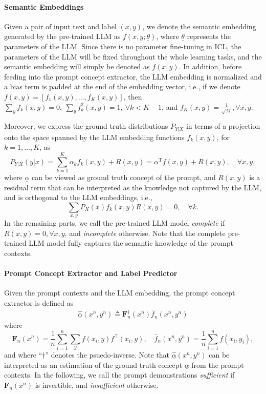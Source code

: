 \documentclass{article} %
\theoremstyle{plain} %
\begin{document}
\paragraph{Semantic Embeddings} 

Given a pair of input text and label $(x,y)$, we denote the semantic embedding generated by the pre-trained LLM as $f(x,y;\underline{\theta})$, where $\underline{\theta}$ represents the parameters of the LLM. Since there is no parameter fine-tuning in ICL, the parameters of the LLM will be fixed throughout the whole learning tasks, and the semantic embedding will simply be denoted as $f(x,y)$. In addition, before feeding into the prompt concept extractor, the LLM embedding is normalized and a bias term is padded at the end of the embedding vector, i.e., if we denote $f(x,y) = [f_1(x,y), \ldots , f_K(x,y)]$, then  $\sum_{y}f_k(x,y) = 0, \  \sum_{y}f^2_k(x,y) = 1, \ \forall k < K-1$, and $f_K(x,y) = \frac{1}{\sqrt{M}}, \forall x,y$.

Moreover, we express the ground truth distributions $P_{Y|X}$ in terms of a projection onto the space spanned by the LLM embedding functions $f_k(x,y)$, for $k = 1, \ldots, K$, as
\begin{equation}\label{equ:model}
    P_{Y|X}(y|x) = \sum_{k=1}^K \alpha_k f_k(x,y) + R(x,y)=  \underline{\alpha}^{\text{T}} f(x,y) + R(x,y) , \quad \forall x,y, 
\end{equation}
where $\underline{\alpha}$ can be viewed as ground truth concept of the prompt, and $R(x,y)$ is a residual term that can be interpreted as the knowledge not captured by the LLM, and is orthogonal to the LLM embeddings, i.e., 
$$
\sum_{x,y}P_X(x)f_k(x,y)R(x,y) = 0, \quad \forall k.
$$
In the remaining parts, we call the pre-trained LLM model \textit{complete} if $R(x,y)= 0 , \forall x,y$, and \textit{incomplete} otherwise. Note that the complete pre-trained LLM model fully captures the semantic knowledge of the prompt contexts.

\paragraph{Prompt Concept Extractor and Label Predictor}

Given the prompt contexts and the LLM embedding, the prompt concept extractor is defined as
\begin{align}\label{equ:def_alpha}
\underline{\hat{\alpha}}(x^n,y^n) \triangleq \mathbf{F}_n^{\dagger}(x^n) \bar{f}_n(x^n,y^n)
\end{align}
where
\begin{equation*}
    \mathbf{F}_n(x^n)  = \frac{1}{n}\sum_{i=1}^n \sum_{y}  f(x_i,y)f^{\top}(x_i,y), \quad \bar{f}_n(x^n,y^n) = \frac{1}{n}\sum_{i=1}^nf(x_i,y_i),
\end{equation*}
and where “$\dagger$” denotes the psuedo-inverse. Note that $\underline{\hat{\alpha}}(x^n,y^n)$  can be interpreted as an estimation of the ground truth concept $\underline{\alpha}$ from the prompt contexts. In the following, we call the prompt demonstrations \textit{sufficient} if $\mathbf{F}_n(x^n)$ is invertible, and \textit{insufficient} otherwise.
\end{document}
